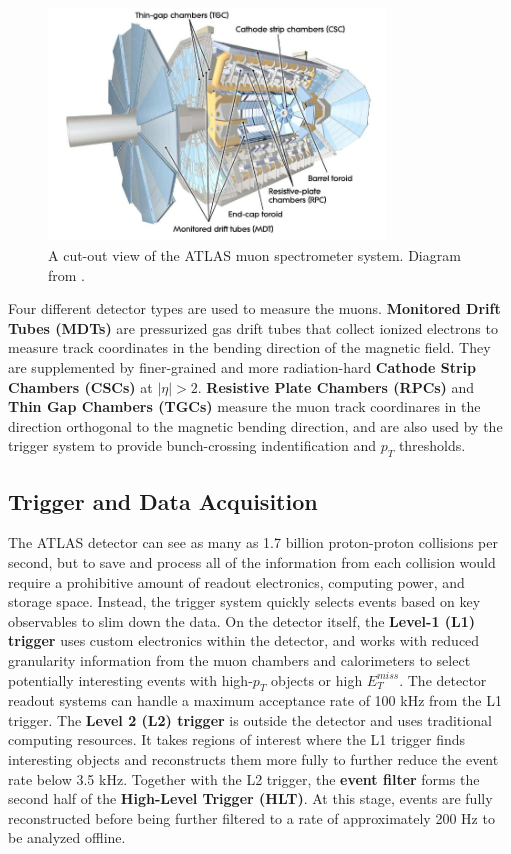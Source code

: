 \begin{figure}[H]
    \centering
    \includegraphics[width=0.8\textwidth]{Figures/2/muon_system.png}
    \caption{A cut-out view of the ATLAS muon spectrometer system. Diagram from \cite{ATLASDesign}.}
    \label{fig:muon_system}
\end{figure}

Four different detector types are used to measure the muons. \textbf{Monitored Drift Tubes (MDTs)} are pressurized gas drift tubes that collect ionized electrons to measure track coordinates in the bending direction of the magnetic field. They are supplemented by finer-grained and more radiation-hard \textbf{Cathode Strip Chambers (CSCs)} at $|\eta | > 2$. \textbf{Resistive Plate Chambers (RPCs)} and \textbf{Thin Gap Chambers (TGCs)} measure the muon track coordinares in the direction orthogonal to the magnetic bending direction, and are also used by the trigger system to provide bunch-crossing indentification and $p_T$ thresholds.

\subsection{Trigger and Data Acquisition}
The ATLAS detector can see as many as 1.7 billion proton-proton collisions per second, but to save and process all of the information from each collision would require a prohibitive amount of readout electronics, computing power, and storage space. Instead, the trigger system quickly selects events based on key observables to slim down the data.  On the detector itself, the \textbf{Level-1 (L1) trigger} uses custom electronics within the detector, and works with reduced granularity information from the muon chambers and calorimeters to select potentially interesting events with high-$p_T$ objects or high $E^{miss}_T$. The detector readout systems can handle a maximum acceptance rate of 100 kHz from the L1 trigger. The \textbf{Level 2 (L2) trigger} is outside the detector and uses traditional computing resources. It takes regions of interest where the L1 trigger finds interesting objects and reconstructs them more fully to further reduce the event rate below 3.5 kHz. Together with the L2 trigger, the \textbf{event filter} forms the second half of the \textbf{High-Level Trigger (HLT)}. At this stage, events are fully reconstructed before being further filtered to a rate of approximately 200 Hz to be analyzed offline.
